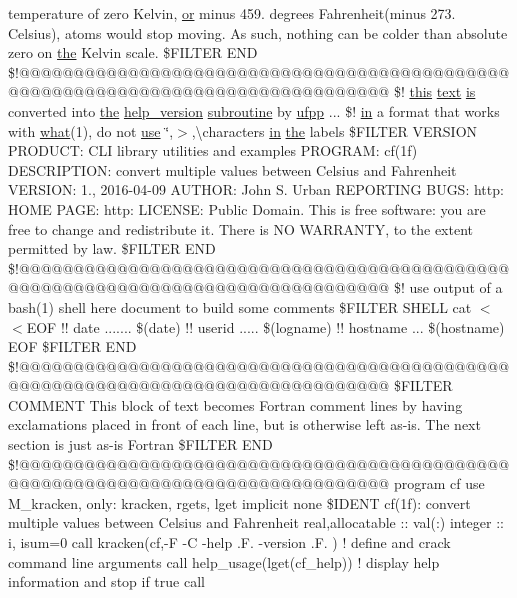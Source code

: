 \begin{DoxyCompactItemize}
temperature of zero Kelvin, \hyperlink{what__overview_81_8txt_a93f5d39a36ed511cc0dc88a20a517388}{or} minus 459. degrees Fahrenheit(minus 273. Celsius), atoms would stop moving. As such, nothing can be colder than absolute zero on \hyperlink{M__stopwatch_83_8txt_a0f266597de2e57eb3aa964927bb30e14}{the} Kelvin scale. \$F\+I\+L\+T\+ER E\+ND \$!@@@@@@@@@@@@@@@@@@@@@@@@@@@@@@@@@@@@@@@@@@@@@@@@@@@@@@@@@@@@@@@@@@@@@@@@@@@@@@@@ \$! \hyperlink{M__stopwatch_83_8txt_ad62a52042bb610eee5b36b5516caec22}{this} \hyperlink{notes_8txt_ad997a48ee1fbabed5333859846b5d9a3}{text} \hyperlink{intro__blas1_83_8txt_a42a91df93f840595de3019ceb5d1df23}{is} converted into \hyperlink{M__stopwatch_83_8txt_a0f266597de2e57eb3aa964927bb30e14}{the} \hyperlink{xauth__key_8f90_ad2aaabc58e93e13e8a0d5acf843eb5d0}{help\+\_\+version} \hyperlink{M__stopwatch_83_8txt_acfbcff50169d691ff02d4a123ed70482}{subroutine} by \hyperlink{ufpp_8f90_ae38e75311f766ddb27e1389ad1e8f7cc}{ufpp} ... \$! \hyperlink{M__journal_83_8txt_afce72651d1eed785a2132bee863b2f38}{in} a format that works with \hyperlink{what__overview_81_8txt_a8cdf8efd1b900d6dce77a3f97edb2216}{what}(1), do not \hyperlink{intro__blas1_83_8txt_a04fa2694d85f67a675bb3f45f7241f48}{use} \char`\"{},$>$,\textbackslash{}characters \hyperlink{M__journal_83_8txt_afce72651d1eed785a2132bee863b2f38}{in} \hyperlink{M__stopwatch_83_8txt_a0f266597de2e57eb3aa964927bb30e14}{the} labels \$F\+I\+L\+T\+ER V\+E\+R\+S\+I\+ON P\+R\+O\+D\+U\+C\+T\+: C\+LI library utilities and examples P\+R\+O\+G\+R\+A\+M\+: cf(1f) D\+E\+S\+C\+R\+I\+P\+T\+I\+O\+N\+: convert multiple values between Celsius and Fahrenheit V\+E\+R\+S\+I\+O\+N\+: 1., 2016-\/04-\/09 A\+U\+T\+H\+O\+R\+: John S. Urban R\+E\+P\+O\+R\+T\+I\+N\+G B\+U\+G\+S\+: http\+: H\+O\+M\+E P\+A\+G\+E\+: http\+: L\+I\+C\+E\+N\+S\+E\+: Public Domain. This is free software\+: you are free to change and redistribute it. There is N\+O W\+A\+R\+R\+A\+N\+T\+Y, to the extent permitted by law. \$\+F\+I\+L\+T\+E\+R E\+N\+D \$!@@@@@@@@@@@@@@@@@@@@@@@@@@@@@@@@@@@@@@@@@@@@@@@@@@@@@@@@@@@@@@@@@@@@@@@@@@@@@@@@ \$! use output of a bash(1) shell here document to build some comments \$\+F\+I\+L\+T\+E\+R S\+H\+E\+L\+L cat $<$$<$\+E\+O\+F !! date ....... \$(date) !! userid ..... \$(logname) !! hostname ... \$(hostname) E\+O\+F \$\+F\+I\+L\+T\+E\+R E\+N\+D \$!@@@@@@@@@@@@@@@@@@@@@@@@@@@@@@@@@@@@@@@@@@@@@@@@@@@@@@@@@@@@@@@@@@@@@@@@@@@@@@@@ \$\+F\+I\+L\+T\+E\+R C\+O\+M\+M\+E\+N\+T This block of text becomes Fortran comment lines by having exclamations placed in front of each line, but is otherwise left as-\/is. The next section is just as-\/is Fortran \$\+F\+I\+L\+T\+E\+R E\+N\+D \$!@@@@@@@@@@@@@@@@@@@@@@@@@@@@@@@@@@@@@@@@@@@@@@@@@@@@@@@@@@@@@@@@@@@@@@@@@@@@@@@@ program cf use M\+\_\+kracken, only\+: kracken, rgets, lget implicit none \$\+I\+D\+E\+N\+T cf(1f)\+: convert multiple values between Celsius and Fahrenheit real,allocatable \+:: val(\+:) integer \+:: i, isum=0 call kracken(\textquotesingle{}cf\textquotesingle{},\textquotesingle{}-\/\+F -\/\+C -\/help .\+F. -\/version .\+F.\textquotesingle{} ) ! define and crack command line arguments call help\+\_\+usage(lget(\textquotesingle{}cf\+\_\+help\textquotesingle{})) ! display help information and stop if true call 
\end{DoxyCompactItemize}
